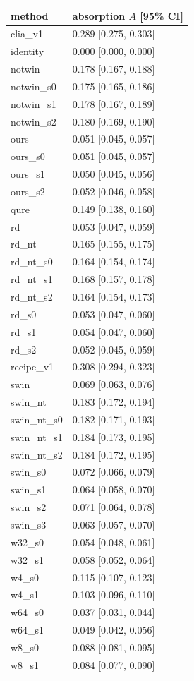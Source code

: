 \begin{tabular}{ll}
\toprule
method & absorption $A$ [95\% CI] \\
\midrule
clia\_v1 & 0.289 [0.275, 0.303] \\
identity & 0.000 [0.000, 0.000] \\
notwin & 0.178 [0.167, 0.188] \\
notwin\_s0 & 0.175 [0.165, 0.186] \\
notwin\_s1 & 0.178 [0.167, 0.189] \\
notwin\_s2 & 0.180 [0.169, 0.190] \\
ours & 0.051 [0.045, 0.057] \\
ours\_s0 & 0.051 [0.045, 0.057] \\
ours\_s1 & 0.050 [0.045, 0.056] \\
ours\_s2 & 0.052 [0.046, 0.058] \\
qure & 0.149 [0.138, 0.160] \\
rd & 0.053 [0.047, 0.059] \\
rd\_nt & 0.165 [0.155, 0.175] \\
rd\_nt\_s0 & 0.164 [0.154, 0.174] \\
rd\_nt\_s1 & 0.168 [0.157, 0.178] \\
rd\_nt\_s2 & 0.164 [0.154, 0.173] \\
rd\_s0 & 0.053 [0.047, 0.060] \\
rd\_s1 & 0.054 [0.047, 0.060] \\
rd\_s2 & 0.052 [0.045, 0.059] \\
recipe\_v1 & 0.308 [0.294, 0.323] \\
swin & 0.069 [0.063, 0.076] \\
swin\_nt & 0.183 [0.172, 0.194] \\
swin\_nt\_s0 & 0.182 [0.171, 0.193] \\
swin\_nt\_s1 & 0.184 [0.173, 0.195] \\
swin\_nt\_s2 & 0.184 [0.172, 0.195] \\
swin\_s0 & 0.072 [0.066, 0.079] \\
swin\_s1 & 0.064 [0.058, 0.070] \\
swin\_s2 & 0.071 [0.064, 0.078] \\
swin\_s3 & 0.063 [0.057, 0.070] \\
w32\_s0 & 0.054 [0.048, 0.061] \\
w32\_s1 & 0.058 [0.052, 0.064] \\
w4\_s0 & 0.115 [0.107, 0.123] \\
w4\_s1 & 0.103 [0.096, 0.110] \\
w64\_s0 & 0.037 [0.031, 0.044] \\
w64\_s1 & 0.049 [0.042, 0.056] \\
w8\_s0 & 0.088 [0.081, 0.095] \\
w8\_s1 & 0.084 [0.077, 0.090] \\
\bottomrule
\end{tabular}
